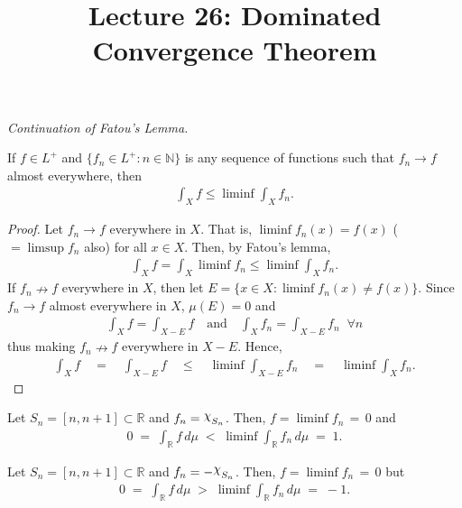 \documentclass[a4paper,english,12pt]{article}
\newcommand{\goodchi}{\protect\raisebox{2.5pt}{$\chi$}}
\begin{document}
\title{Lecture 26: Dominated Convergence Theorem}
\author{}
\maketitle

\textit{Continuation of Fatou's Lemma.}

\begin{cor} If $f\in L^+$ and $\{f_n\in L^+:n\in \mathbb{N}\}$ is any sequence of functions such that $f_n\rightarrow f$ almost everywhere, then 
	\begin{align*} 
		\int_X f \leqslant \liminf \int_X f_n.
	\end{align*}
\label{fatou_ae}	
\end{cor}
\begin{proof} Let $f_n\rightarrow f$ everywhere in $X$. That is, $\liminf f_n(x)=f(x)$ ($=\limsup f_n$ also) for all $x\in X$. Then, by Fatou's lemma, 
	\begin{align*} 
		\int_X f =\int_X \liminf f_n \leqslant \liminf \int_X f_n.
	\end{align*}
If $f_n\nrightarrow f$ everywhere in $X$, then let $E=\{x\in X:\liminf f_n(x)\neq f(x)\}$. Since $f_n\rightarrow f$ almost everywhere in $X$, $\mu (E)=0$ and 
	\begin{align*} 
		\int_X f =\int_{X-E} f \quad\text{and}\quad \int_X f_n =\int_{X-E} f_n \;\;\forall n
	\end{align*}
thus making $f_n\nrightarrow f$ everywhere in $X-E$. Hence,
	\begin{align*} 
		\int_X f \quad=\quad \int_{X-E} f \quad\leqslant\quad \liminf \int_{X-E} f_n \quad=\quad \liminf \int_X f_n.
	\end{align*}
\end{proof}

\begin{exmp} Let $S_n=[n,n+1]\subset \mathbb{R}$ and $f_n=\goodchi _{S_n}$. Then, $f=\liminf f_n\,=\,0$ and
	\begin{align*}
		0 \;=\; \int_{\mathbb{R}}f\,d\mu \;<\; \liminf \int_{\mathbb{R}}f_n\,d\mu \;=\;1.
	\end{align*}
\end{exmp}


\begin{exmp} Let $S_n=[n,n+1]\subset \mathbb{R}$ and $f_n=-\goodchi _{S_n}$. Then, $f=\liminf f_n\,=\,0$ but 
	\begin{align*}
		0 \;=\; \int_{\mathbb{R}}f\,d\mu \;>\; \liminf \int_{\mathbb{R}}f_n\,d\mu \;=\;-1.
	\end{align*}
\end{exmp}
\end{document}
